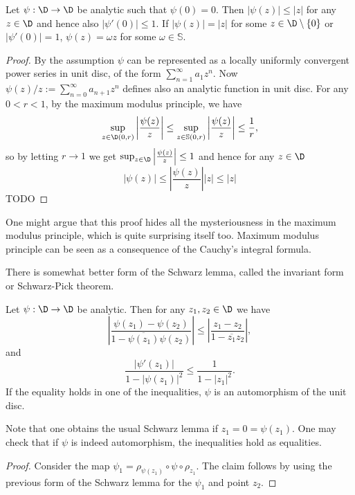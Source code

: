 \begin{lause}
	Let $\psi : \D \to \D$ be analytic such that $\psi(0) = 0$. Then $|\psi(z)| \leq |z|$ for any $z \in \D$ and hence also $|\psi'(0)| \leq 1$. If $|\psi(z)| = |z|$ for some $z \in \D \setminus \{0\}$ or $|\psi'(0)| = 1$, $\psi(z) = \omega z$ for some $\omega \in \mathbb{S}$.
\end{lause}
\begin{proof}
	By the assumption $\psi$ can be represented as a locally uniformly convergent power series in unit disc, of the form $\sum_{n = 1}^{\infty}a_{1} z^{n}$. Now $\psi(z)/z := \sum_{n = 0}^{\infty} a_{n + 1} z^{n}$ defines also an analytic function in unit disc. For any $0 < r < 1$, by the maximum modulus principle, we have
	\[
		\sup_{z \in \D(0, r)} \left|\frac{\psi(z)}{z}\right| \leq \sup_{z \in \mathbb{S}(0, r)} \left|\frac{\psi(z)}{z}\right| \leq \frac{1}{r},
	\]
	so by letting $r \to 1$ we get $\sup_{z \in \D} \left|\frac{\psi(z)}{z}\right| \leq 1$ and hence for any $z \in \D$
	\[
		|\psi(z)| \leq \left|\frac{\psi(z)}{z}\right| |z| \leq |z|
	\]
	TODO
\end{proof}

One might argue that this proof hides all the mysteriousness in the maximum modulus principle, which is quite surprising itself too. Maximum modulus principle can be seen as a consequence of the Cauchy's integral formula.

There is somewhat better form of the Schwarz lemma, called the invariant form or Schwarz-Pick theorem.

\begin{lause}
	Let $\psi : \D \to \D$ be analytic. Then for any $z_{1}, z_{2} \in \D$ we have
	\[
		\left|\frac{\psi(z_{1}) - \psi(z_{2})}{1 - \overline{\psi(z_{1})} \psi(z_{2})} \right| \leq \left|\frac{z_{1} - z_{2}}{1 - \overline{z_{1}}z_{2}}\right|,
	\]
	and
	\[
		\frac{\left|\psi'(z_{1})\right|}{1 - |\psi(z_{1})|^2} \leq \frac{1}{1 - |z_{1}|^2}.
	\]
	If the equality holds in one of the inequalities, $\psi$ is an automorphism of the unit disc. 
\end{lause}

Note that one obtains the usual Schwarz lemma if $z_{1} = 0 = \psi(z_{1})$. One may check that if $\psi$ is indeed automorphism, the inequalities hold as equalities.
\begin{proof}
	Consider the map $\psi_{1} = \rho_{\psi(z_{1})} \circ \psi \circ \rho_{z_{1}}$. The claim follows by using the previous form of the Schwarz lemma for the $\psi_{1}$ and point $z_{2}$.
\end{proof}

